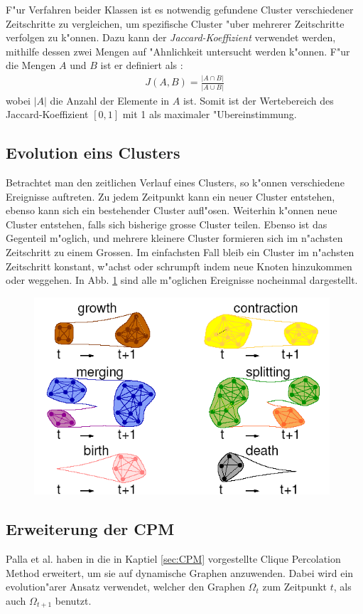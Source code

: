 \documentclass[journal]{vgtc}
\begin{document}
  F"ur Verfahren beider Klassen ist es notwendig gefundene Cluster verschiedener Zeitschritte zu vergleichen, um spezifische Cluster "uber
  mehrerer Zeitschritte verfolgen zu k"onnen. Dazu kann der \emph{Jaccard-Koeffizient} verwendet werden, mithilfe dessen zwei Mengen auf "Ahnlichkeit
  untersucht werden k"onnen. F"ur die Mengen $A$ und $B$ ist er definiert als \cite{timestep}:
  \begin{align}
    J(A,B)=\frac{|A \cap B|}{|A \cup B|}
  \end{align}
  wobei $|A|$ die Anzahl der Elemente in $A$ ist. Somit ist der Wertebereich des Jaccard-Koeffizient $[0,1]$ mit 1 als maximaler "Ubereinstimmung.
  
  \subsection{Evolution eins Clusters}
    Betrachtet man den zeitlichen Verlauf eines Clusters, so k"onnen verschiedene Ereignisse auftreten. Zu jedem Zeitpunkt kann ein neuer Cluster
    entstehen, ebenso kann sich ein bestehender Cluster aufl"osen. Weiterhin k"onnen neue Cluster entstehen, falls sich bisherige grosse Cluster
    teilen. Ebenso ist das Gegenteil m"oglich, und mehrere kleinere Cluster formieren sich im n"achsten Zeitschritt zu einem Grossen.
    Im einfachsten Fall bleib ein Cluster im n"achsten Zeitschritt konstant, w"achst oder schrumpft indem neue Knoten hinzukommen oder weggehen.
    In Abb. \ref{fig:evolution} sind alle m"oglichen Ereignisse nocheinmal dargestellt.
    \begin{figure}[t]
      \centering
      \includegraphics[width=11cm]{images/evolution_alone}
      \caption{\cite{CPM_time}}
      \label{fig:evolution}
    \end{figure}
  \subsection{Erweiterung der CPM}
    \label{sec:CPM_time}
    Palla et al. haben in \cite{CPM_time} die in Kaptiel \ref{sec:CPM} vorgestellte Clique Percolation Method erweitert, um sie auf dynamische
    Graphen anzuwenden. Dabei wird ein evolution"arer Ansatz verwendet, welcher den Graphen $\Omega_{t}$ zum Zeitpunkt $t$, als auch $\Omega_{t+1}$
    benutzt.
    
\end{document}
